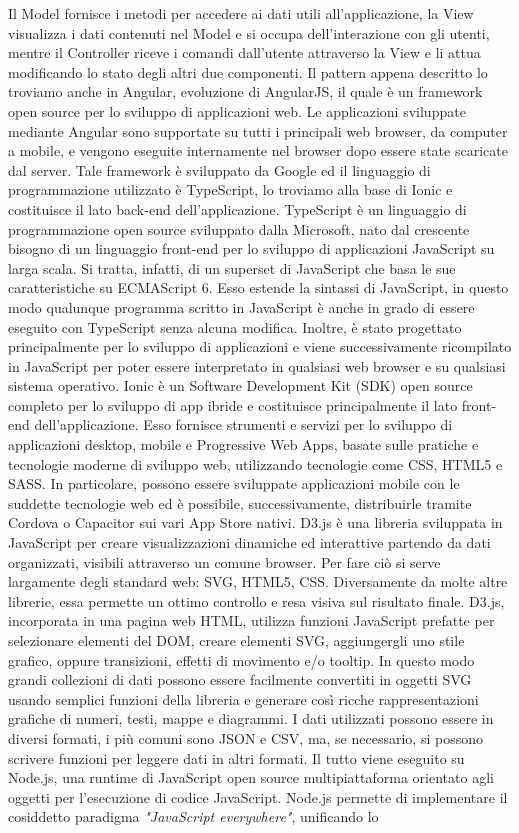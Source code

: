 Il Model fornisce i metodi per accedere ai dati utili all'applicazione, la View visualizza i dati contenuti nel Model e si occupa dell'interazione con gli utenti, mentre il Controller riceve i comandi dall'utente attraverso la View e li attua modificando lo stato degli altri due componenti. Il pattern appena descritto lo troviamo anche in Angular, evoluzione di AngularJS, il quale \`{e} un framework open source per lo sviluppo di applicazioni web. Le applicazioni sviluppate mediante Angular sono supportate su tutti i principali web browser, da computer a mobile, e vengono eseguite internamente nel browser dopo essere state scaricate dal server. Tale framework \`{e} sviluppato da Google ed il linguaggio di programmazione utilizzato \`{e} TypeScript, lo troviamo alla base di Ionic e costituisce il lato back-end dell'applicazione. TypeScript \`{e} un linguaggio di programmazione open source sviluppato dalla Microsoft, nato dal crescente bisogno di un linguaggio front-end per lo sviluppo di applicazioni JavaScript su larga scala. Si tratta, infatti, di un superset di JavaScript che basa le sue caratteristiche su ECMAScript 6. Esso estende la sintassi di JavaScript, in questo modo qualunque programma scritto in JavaScript \`{e} anche in grado di essere eseguito con TypeScript senza alcuna modifica. Inoltre, \`{e} stato progettato principalmente per lo sviluppo di applicazioni e viene successivamente ricompilato in JavaScript per poter essere interpretato in qualsiasi web browser e su qualsiasi sistema operativo. Ionic \`{e} un Software Development Kit (SDK) open source completo per lo sviluppo di app ibride e costituisce principalmente il lato front-end dell'applicazione. Esso fornisce strumenti e servizi per lo sviluppo di applicazioni desktop, mobile e Progressive Web Apps, basate sulle pratiche e tecnologie moderne di sviluppo web, utilizzando tecnologie come CSS, HTML5 e SASS. In particolare, possono essere sviluppate applicazioni mobile con le suddette tecnologie web ed \`{e} possibile, successivamente, distribuirle tramite Cordova o Capacitor sui vari App Store nativi. D3.js \`{e} una libreria sviluppata in JavaScript per creare visualizzazioni dinamiche ed interattive partendo da dati organizzati, visibili attraverso un comune browser. Per fare ci\`{o} si serve largamente degli standard web: SVG, HTML5, CSS. Diversamente da molte altre librerie, essa permette un ottimo controllo e resa visiva sul risultato finale. D3.js, incorporata in una pagina web HTML, utilizza funzioni JavaScript prefatte per selezionare elementi del DOM, creare elementi SVG, aggiungergli uno stile grafico, oppure transizioni, effetti di movimento e/o tooltip. In questo modo grandi collezioni di dati possono essere facilmente convertiti in oggetti SVG usando semplici funzioni della libreria e generare cos\`{i} ricche rappresentazioni grafiche di numeri, testi, mappe e diagrammi. I dati utilizzati possono essere in diversi formati, i pi\`{u} comuni sono JSON e CSV, ma, se necessario, si possono scrivere funzioni per leggere dati in altri formati. Il tutto viene eseguito su Node.js, una runtime di JavaScript open source multipiattaforma orientato agli oggetti per l'esecuzione di codice JavaScript. Node.js permette di implementare il cosiddetto paradigma \textit{"JavaScript everywhere"}, unificando lo 
